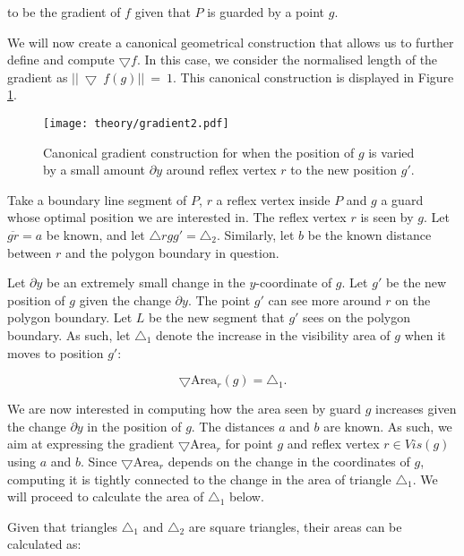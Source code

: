 to be the gradient of $f$ given that $P$ is guarded by a point $g$. 

We will now create a canonical geometrical construction that allows us to further define and compute $\bigtriangledown f$. In this case, we consider the normalised length of the gradient as $||~\bigtriangledown~f(g)||~=~1$. This canonical construction is displayed in Figure \ref{fig:gradient}. 

\begin{figure}[h!]
    \centering
    \texttt{[image: theory/gradient2.pdf]}
    \caption{Canonical gradient construction for when the position of $g$ is varied by a small amount $\partial y$ around reflex vertex $r$ to the new position $g'$.}
    \label{fig:gradient}
\end{figure}

Take a boundary line segment of $P$, $r$ a reflex vertex inside $P$ and $g$ a guard whose optimal position we are interested in. The reflex vertex $r$ is seen by $g$. Let $\overline{gr} = a$ be known, and let $\triangle rgg' = \triangle_2$. Similarly, let $b$ be the known distance between $r$ and the polygon boundary in question.


Let $\partial y$ be an extremely small change in the $y$-coordinate of $g$. Let $g'$ be the new position of $g$ given the change $\partial y$. The point $g'$ can see more around $r$ on the polygon boundary. Let $L$ be the new segment that $g'$ sees on the polygon boundary. As such, let $\triangle_1$ denote the increase in the visibility area of $g$ when it moves to position $g'$:

\begin{equation}
    \bigtriangledown \text{Area}_r(g) = \triangle_1. \label{eq:derivative}
\end{equation}

We are now interested in computing how the area seen by guard $g$ increases given the change $\partial y$ in the position of $g$. The distances $a$ and $b$ are known. As such, we aim at expressing the gradient $\bigtriangledown \text{Area}_r$ for point $g$ and reflex vertex $r \in \mathit{Vis}(g)$ using $a$ and $b$. Since $\bigtriangledown \text{Area}_r$ depends on the change in the coordinates of $g$, computing it is tightly connected to the change in the area of triangle $\triangle_1$. We will proceed to calculate the area of $\triangle_1$ below.

Given that triangles $\triangle_1$ and $\triangle_2$ are square triangles, their areas can be calculated as:

